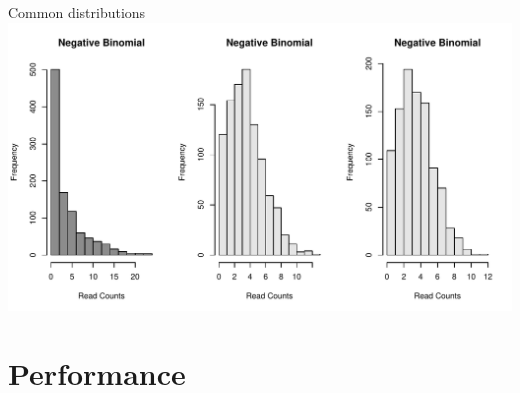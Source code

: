 \documentclass{beamer}\usepackage[]{graphicx}\usepackage[]{color}
\makeatletter
\def\maxwidth{ %
  \ifdim\Gin@nat@width>\linewidth
    \linewidth
  \else
    \Gin@nat@width
  \fi
}
\newenvironment{knitrout}{}{} %
\makeatother
\begin{document}
\begin{frame}
\begin{block}{Common distributions}
\begin{knitrout}
\color{fgcolor}
\includegraphics[width=\maxwidth]{figure/dist-02-1} 

\end{knitrout}
\end{block}
\end{frame}



\section{Performance}
\begin{frame}
\begin{center}
\insertsection
\end{center}
\end{frame}
\end{document}
